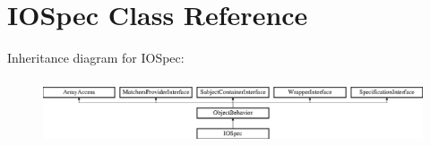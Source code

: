\section{I\+O\+Spec Class Reference}
\label{classspec_1_1_php_spec_1_1_console_1_1_i_o_spec}
Inheritance diagram for I\+O\+Spec\+:\begin{figure}[H]
\begin{center}
\leavevmode
\includegraphics[height=1.953488cm]{classspec_1_1_php_spec_1_1_console_1_1_i_o_spec}
\end{center}
\end{figure}
